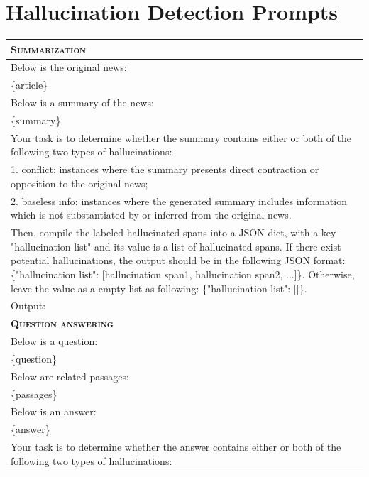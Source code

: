 \documentclass[11pt]{article}
\begin{document}
\clearpage

\section{Hallucination Detection Prompts}
\label{sec:detect_prompts}

\begin{table}[!ht]

\renewcommand{\arraystretch}{1.1}

\small
\centering
    \begin{tabular}{p{}}
    \toprule
    \textbf{\textsc{Summarization}}\\
    \midrule
    Below is the original news:\\
\{article\}\\
Below is a summary of the news:\\
\{summary\}\\
Your task is to determine whether the summary contains either or both of the following two types of hallucinations:\\
1. conflict: instances where the summary presents direct contraction or opposition to the original news;\\
2. baseless info: instances where the generated summary includes information which is not substantiated by or inferred from the original news. \\
Then, compile the labeled hallucinated spans into a JSON dict, with a key "hallucination list" and its value is a list of hallucinated spans. If there exist potential hallucinations, the output should be in the following JSON format: \{"hallucination list": [hallucination span1, hallucination span2, ...]\}. Otherwise, leave the value as a empty list as following: \{"hallucination list": []\}.\\
Output:\\
    \midrule
    \textbf{\textsc{Question answering}}\\
    \midrule
        Below is a question:\\
\{question\}\\
Below are related passages:\\
\{passages\}\\
Below is an answer:\\
\{answer\}\\
Your task is to determine whether the answer contains either or both of the following two types of hallucinations: \\

\end{tabular}
\end{table}
\end{document}
